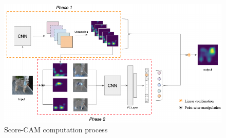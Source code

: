 \begin{figure}[t]
    \centering
    \includegraphics[width=\textwidth]{fig/rel/images/scorecam_schema.pdf}
    \caption{Score-CAM computation process \autocite{wang2020score}}
    \label{fig:rel_sccam}
\end{figure}